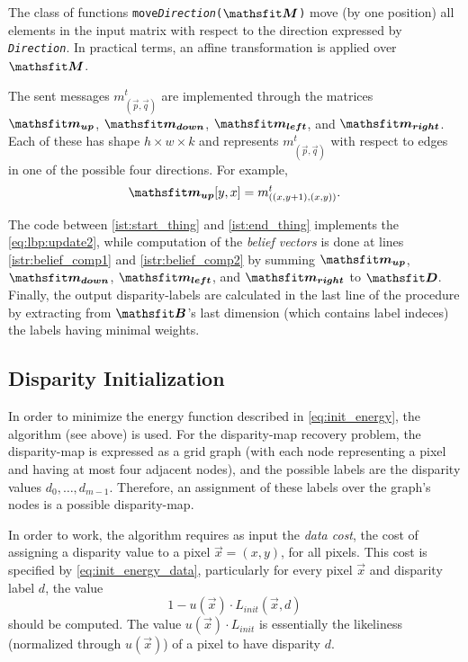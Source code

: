 \begin{FunctionBlock}
	The class of functions \texttt{move\textit{Direction}($\mat M$)} move (by one position) all elements in the input matrix with respect to the direction expressed by \texttt{\textit{Direction}}. In practical terms, an affine transformation is applied over $\mat M$.
\end{FunctionBlock}

The sent messages $m^t_{(\vec p,\vec q)}$ are implemented through the matrices $\mat{m_{up}}$,  $\mat{m_{down}}$, $\mat {m_{left}}$, and $\mat{m_{right}}$. Each of these has shape $h\times w \times k$ and represents $m^t_{(\vec p,\vec q)}$ with respect to edges in one of the possible four directions. For example,
$$\mat{m_{up}}[y,x] = m^t_{\left((x,y+1), (x,y)\right)}.$$

The code between \cref{ist:start_thing} and \cref{ist:end_thing} implements the \cref{eq:lbp:update2}, while computation of the \emph{belief vectors} is done at lines \ref{istr:belief_comp1} and \ref{istr:belief_comp2} by summing $\mat{m_{up}}$,  $\mat{m_{down}}$, $\mat {m_{left}}$, and $\mat{m_{right}}$ to $\mat D$.
 Finally, the output disparity-labels are calculated in the last line of the procedure by extracting from $\mat B$'s last dimension (which contains label indeces) the labels having minimal weights.

\subsection{Disparity Initialization}\label{sec:init_phase_alg}
In order to minimize the energy function described in \cref{eq:init_energy}, the \LBP{} algorithm (see above) is used.
For the disparity-map recovery problem, the disparity-map is expressed as a grid graph (with each node representing a pixel and having at most four adjacent nodes), and the possible labels are the disparity values $d_0,\dots,d_{m-1}$. Therefore, an assignment of these labels over the graph's nodes is a possible disparity-map.

In order to work, the \LBP{} algorithm requires as input the \emph{data cost}, \ie{} the cost of assigning a disparity value to a pixel $\vec x =(x,y)$, for all pixels.
This cost is  specified by \cref{eq:init_energy_data}, particularly for every pixel $\vec x$ and disparity label $d$, the value 
$$1 - u(\vec x)\cdot L_{init}(\vec x, d)$$ should be computed. The value $u(\vec x)\cdot L_{init}$ is essentially the likeliness (normalized through $u(\vec x)$) of a pixel to have disparity $d$. 

